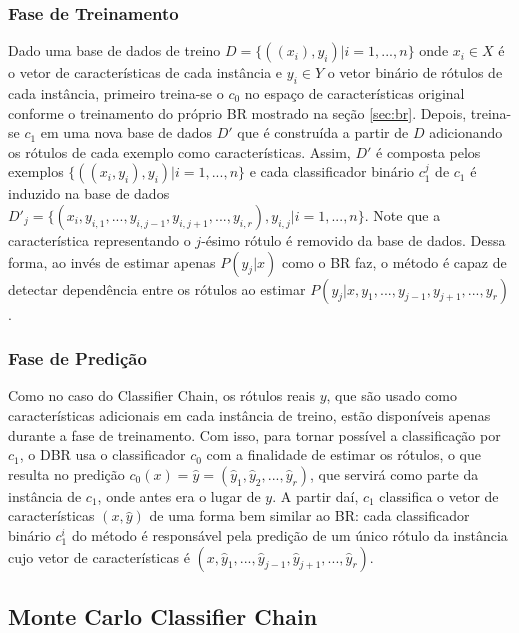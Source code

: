   \subsubsection{Fase de Treinamento}
  Dado uma base de dados de treino $D=\{((x_i),y_i)|i=1,...,n\}$ onde $x_i \in X$ é o vetor de características de cada instância
  e $y_i \in Y$ o vetor binário de rótulos de cada instância,
  primeiro treina-se o $c_0$
  no espaço de características original conforme o treinamento do próprio BR mostrado na seção \ref{sec:br}.
  Depois, treina-se $c_1$ em uma nova base de dados $D'$ que é construída a partir de $D$ adicionando os rótulos de cada
  exemplo como características. Assim, $D'$ é composta pelos exemplos $\{((x_i,y_i),y_i) |i=1,...,n\}$ e
  cada classificador binário $c_1^j$ de $c_1$ é induzido na base de dados $D'_j=\{(x_i,y_{i,1},...,y_{i,j-1},y_{i,j+1},...,y_{i,r}),y_{i,j} | i=1,...,n\}$.
  Note que a característica representando o $j$-ésimo rótulo é removido da base de dados.
  Dessa forma, ao invés de estimar apenas $P(y_j|x)$ como o BR faz, o método é capaz de detectar dependência entre os rótulos ao
  estimar $P(y_j|x,y_1,...,y_{j-1},y_{j+1},...,y_r)$.
  
  \subsubsection{Fase de Predição}
  Como no caso do Classifier Chain, os rótulos reais $y$, que são usado como características adicionais em cada instância de treino,
 estão disponíveis apenas durante a fase de treinamento.
 Com isso, para tornar possível a classificação por $c_1$, o DBR usa o classificador $c_0$ com a finalidade de
 estimar os rótulos, %
 o que resulta no predição $c_0(x)=\hat{y}=(\hat{y}_1,\hat{y}_2,...,\hat{y}_r)$, que servirá como parte da instância de $c_1$,
 onde antes era o lugar de $y$. 
 A partir daí, $c_1$ classifica o vetor de características $(x,\hat{y})$ de uma forma bem similar ao BR:
 cada classificador binário $c_1^i$ do método é responsável pela predição de um único rótulo da instância
 cujo vetor de características é $(x,\hat{y}_1,...,\hat{y}_{j-1},\hat{y}_{j+1},...,\hat{y}_r)$.

\subsection{Monte Carlo Classifier Chain}
\cite{mcc2012}

